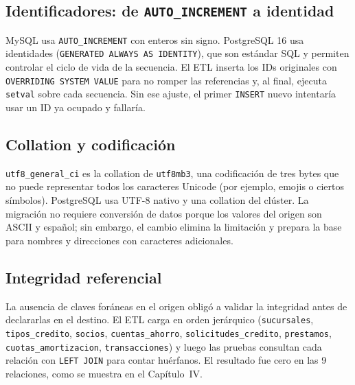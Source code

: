\subsection{Identificadores: de \texttt{AUTO\_INCREMENT} a identidad}

MySQL usa \texttt{AUTO\_INCREMENT} con enteros sin signo. PostgreSQL 16 usa
identidades (\texttt{GENERATED ALWAYS AS IDENTITY}), que son estándar SQL y
permiten controlar el ciclo de vida de la secuencia. El ETL inserta los IDs
originales con \texttt{OVERRIDING SYSTEM VALUE} para no romper las referencias
y, al final, ejecuta \texttt{setval} sobre cada secuencia. Sin ese ajuste, el
primer \texttt{INSERT} nuevo intentaría usar un ID ya ocupado y fallaría.

\subsection{Collation y codificación}

\texttt{utf8\_general\_ci} es la collation de \texttt{utf8mb3}, una
codificación de tres bytes que no puede representar todos los caracteres
Unicode (por ejemplo, emojis o ciertos símbolos). PostgreSQL usa UTF-8 nativo
y una collation del clúster. La migración no requiere conversión de datos
porque los valores del origen son ASCII y español; sin embargo, el cambio
elimina la limitación y prepara la base para nombres y direcciones con
caracteres adicionales.

\subsection{Integridad referencial}

La ausencia de claves foráneas en el origen obligó a validar la integridad
antes de declararlas en el destino. El ETL carga en orden jerárquico
(\texttt{sucursales}, \texttt{tipos\_credito}, \texttt{socios},
\texttt{cuentas\_ahorro}, \texttt{solicitudes\_credito}, \texttt{prestamos},
\texttt{cuotas\_amortizacion}, \texttt{transacciones}) y luego las pruebas
consultan cada relación con \texttt{LEFT JOIN} para contar huérfanos. El
resultado fue cero en las 9 relaciones, como se muestra en el
Capítulo~IV.
